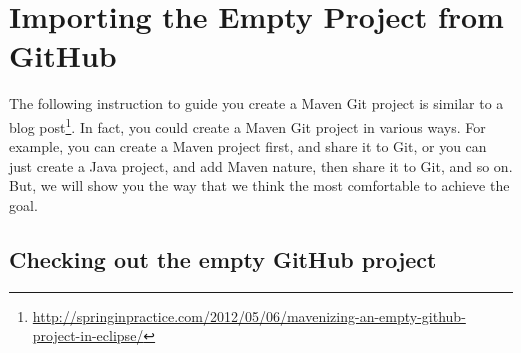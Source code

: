 
\section{Importing the Empty Project from GitHub}

The following instruction to guide you create a Maven Git project is similar to
a blog
post\footnote{\url{http://springinpractice.com/2012/05/06/mavenizing-an-empty-github-project-in-eclipse/}}.
In fact, you could create a Maven Git project in various ways. For example, you
can create a Maven project first, and share it to Git, or you can just create a
Java project, and add Maven nature, then share it to Git, and so on. But, we
will show you the way that we think the most comfortable to achieve the goal.

\subsection{Checking out the empty GitHub project}

